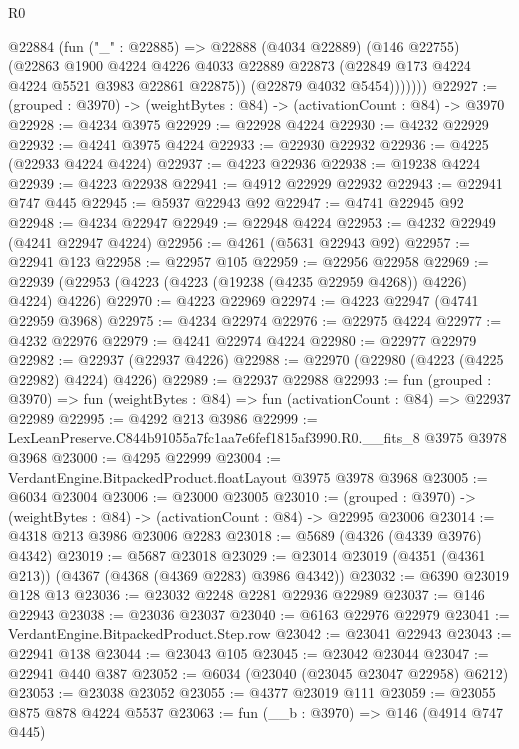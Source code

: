 \begin{lexlean}{R0}
\begin{coremodule}
            @22884
              (fun ("_" : @22885) =>
              @22888
                (@4034 @22889)
                (@146 @22755)
                (@22863
                  @1900
                  @4224
                  @4226
                  @4033
                  @22889
                  @22873
                  (@22849 @173 @4224 @4224 @5521 @3983 @22861 @22875))
                (@22879 @4032 @5454)))))))
@22927 := (grouped : @3970) -> (weightBytes : @84) -> (activationCount : @84) -> @3970
@22928 := @4234 @3975
@22929 := @22928 @4224
@22930 := @4232 @22929
@22932 := @4241 @3975 @4224
@22933 := @22930 @22932
@22936 := @4225 (@22933 @4224 @4224)
@22937 := @4223 @22936
@22938 := @19238 @4224
@22939 := @4223 @22938
@22941 := @4912 @22929 @22932
@22943 := @22941 @747 @445
@22945 := @5937 @22943 @92
@22947 := @4741 @22945 @92
@22948 := @4234 @22947
@22949 := @22948 @4224
@22953 := @4232 @22949 (@4241 @22947 @4224)
@22956 := @4261 (@5631 @22943 @92)
@22957 := @22941 @123
@22958 := @22957 @105
@22959 := @22956 @22958
@22969 := @22939 (@22953 (@4223 (@4223 (@19238 (@4235 @22959 @4268)) @4226) @4224) @4226)
@22970 := @4223 @22969
@22974 := @4223 @22947 (@4741 @22959 @3968)
@22975 := @4234 @22974
@22976 := @22975 @4224
@22977 := @4232 @22976
@22979 := @4241 @22974 @4224
@22980 := @22977 @22979
@22982 := @22937 (@22937 @4226)
@22988 := @22970 (@22980 (@4223 (@4225 @22982) @4224) @4226)
@22989 := @22937 @22988
@22993 := fun (grouped : @3970) =>
  fun (weightBytes : @84) => fun (activationCount : @84) => @22937 @22989
@22995 := @4292 @213 @3986
@22999 := LexLeanPreserve.C844b91055a7fc1aa7e6fef1815af3990.R0.__fits_8 @3975 @3978 @3968
@23000 := @4295 @22999
@23004 := VerdantEngine.BitpackedProduct.floatLayout @3975 @3978 @3968
@23005 := @6034 @23004
@23006 := @23000 @23005
@23010 := (grouped : @3970) -> (weightBytes : @84) -> (activationCount : @84) -> @22995 @23006
@23014 := @4318 @213 @3986 @23006 @2283
@23018 := @5689 (@4326 (@4339 @3976) @4342)
@23019 := @5687 @23018
@23029 := @23014 @23019 (@4351 (@4361 @213)) (@4367 (@4368 (@4369 @2283) @3986 @4342))
@23032 := @6390 @23019 @128 @13
@23036 := @23032 @2248 @2281 @22936 @22989
@23037 := @146 @22943
@23038 := @23036 @23037
@23040 := @6163 @22976 @22979
@23041 := VerdantEngine.BitpackedProduct.Step.row
@23042 := @23041 @22943
@23043 := @22941 @138
@23044 := @23043 @105
@23045 := @23042 @23044
@23047 := @22941 @440 @387
@23052 := @6034 (@23040 (@23045 @23047 @22958) @6212)
@23053 := @23038 @23052
@23055 := @4377 @23019 @111
@23059 := @23055 @875 @878 @4224 @5537
@23063 := fun (__b : @3970) => @146 (@4914 @747 @445)

\end{coremodule}
\end{lexlean}
